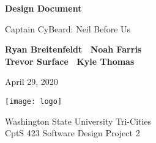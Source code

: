 \begin{titlepage}
    \begin{center}
        \vspace*{1cm}

        \Huge
        \textbf{Design Document}

        \vspace{.5cm}
        \LARGE
        Captain CyBeard: Neil Before Us

        \vspace{1cm}

        \textbf{Ryan Breitenfeldt \textbar\ Noah Farris\\ Trevor Surface \textbar\ Kyle Thomas}

        \vspace{.2cm}
        \Large
        April 29, 2020

        \vspace{2cm}
        \texttt{[image: logo]}

        \vfill

        Washington State University Tri-Cities\\
        CptS 423 Software Design Project 2

    \end{center}
\end{titlepage}

